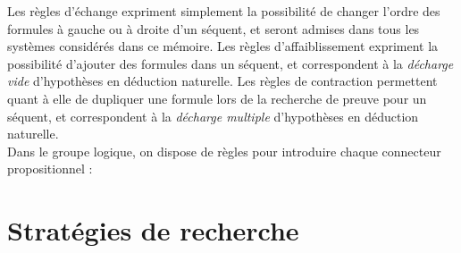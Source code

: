 \documentclass[12pt]{report}
\newcommand{\lto}{\Rightarrow}
\newcommand{\seq}{\vdash}
\newcommand{\irule}[1]{\footnotesize$#1$}
\newcommand{\iruleL}[1]{\irule{{#1}\seq}}
\newcommand{\iruleR}[1]{\irule{\seq{#1}}}
\begin{document}
Les règles d’échange expriment simplement la possibilité de changer l’ordre des formules à gauche ou à droite d’un séquent, et seront admises dans tous les systèmes considérés dans ce mémoire. Les règles d’affaiblissement expriment la possibilité d’ajouter des formules dans un séquent, et correspondent à la \emph{décharge vide} d’hypothèses en déduction naturelle. Les règles de contraction permettent quant à elle de dupliquer une formule lors de la recherche de preuve pour un séquent, et correspondent à la \emph{décharge multiple} d’hypothèses en déduction naturelle.\\

Dans le groupe logique, on dispose de règles pour introduire chaque connecteur propositionnel :


\section{Stratégies de recherche}
\end{document}
